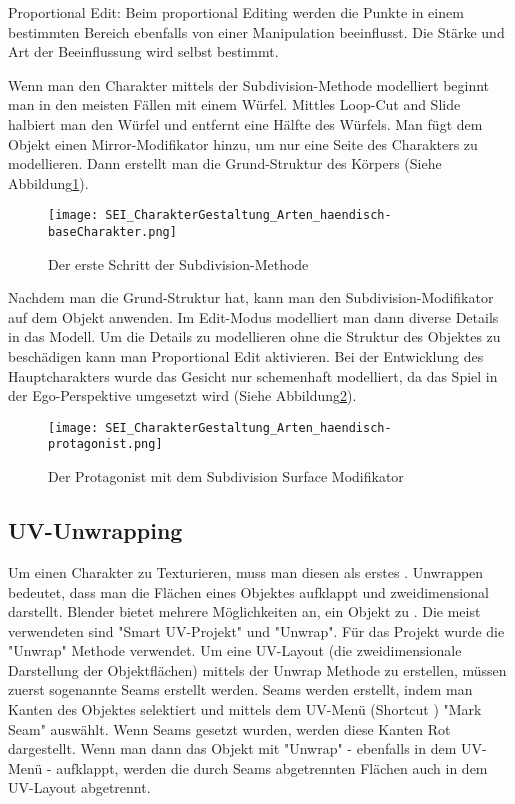 Proportional Edit\citep{blender:prop_editing}:
Beim proportional Editing werden die Punkte in einem bestimmten Bereich ebenfalls von einer Manipulation beeinflusst.
Die Stärke und Art der Beeinflussung wird selbst bestimmt.


Wenn man den Charakter mittels der Subdivision-Methode modelliert beginnt man in den meisten Fällen mit einem Würfel.
Mittles Loop-Cut and Slide halbiert man den Würfel und entfernt eine Hälfte des Würfels. Man fügt dem Objekt einen
Mirror-Modifikator hinzu, um nur eine Seite des Charakters zu modellieren. Dann erstellt man die Grund-Struktur des
Körpers (Siehe Abbildung\ref{picture:base_body}).

\begin{figure}[H]
    \centering
    \texttt{[image: SEI\_CharakterGestaltung\_Arten\_haendisch-baseCharakter.png]}
    \caption{Der erste Schritt der Subdivision-Methode}
    \label{picture:base_body}
\end{figure}

Nachdem man die Grund-Struktur hat, kann man den Subdivision-Modifikator auf dem Objekt anwenden. Im Edit-Modus
modelliert man dann diverse Details in das Modell. Um die Details zu modellieren ohne die Struktur des Objektes
zu beschädigen kann man Proportional Edit aktivieren. Bei der Entwicklung des Hauptcharakters wurde das Gesicht
nur schemenhaft modelliert, da das Spiel in der Ego-Perspektive umgesetzt wird (Siehe Abbildung\ref{picture:protagonist}).

\begin{figure}[H]
    \centering
    \texttt{[image: SEI\_CharakterGestaltung\_Arten\_haendisch-protagonist.png]}
    \caption{Der Protagonist mit dem Subdivision Surface Modifikator}
    \label{picture:protagonist}
\end{figure}


\subsection{UV-Unwrapping}
\label{sec:unwrapping}

Um einen Charakter zu Texturieren, muss man diesen als erstes . Unwrappen bedeutet, dass man die Flächen
eines Objektes aufklappt und zweidimensional darstellt. Blender bietet mehrere Möglichkeiten an, ein Objekt zu
. Die meist verwendeten sind "Smart UV-Projekt"\citep{blender:smart_uv} und
"Unwrap"\citep{blender:unwrap}. Für das Projekt wurde die "Unwrap" Methode verwendet. Um eine UV-Layout
(die zweidimensionale Darstellung der Objektflächen) mittels der Unwrap Methode zu erstellen, müssen zuerst sogenannte
Seams erstellt werden\citep{blender:seams}. Seams werden erstellt, indem man Kanten des Objektes selektiert und mittels
dem UV-Menü (Shortcut ) "Mark Seam" auswählt. Wenn Seams gesetzt wurden, werden diese Kanten Rot dargestellt.
Wenn man dann das Objekt mit "Unwrap" - ebenfalls in dem UV-Menü - aufklappt, werden die durch Seams abgetrennten
Flächen auch in dem UV-Layout abgetrennt.

